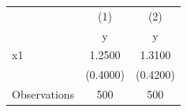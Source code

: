 \begin{tabular}{lcc}
\toprule
          & (1) & (2) \\
          & y   & y   \\
\midrule
x1        & 1.2500 & 1.3100 \\
          & (0.4000) & (0.4200) \\
Observations & 500 & 500 \\
\bottomrule
\end{tabular}
